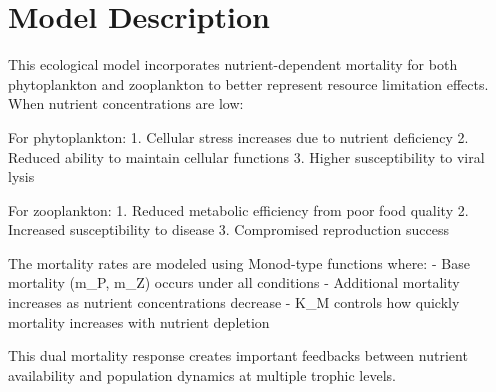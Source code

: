 \section{Model Description}

This ecological model incorporates nutrient-dependent mortality for both phytoplankton and zooplankton to better represent resource limitation effects. When nutrient concentrations are low:

For phytoplankton:
1. Cellular stress increases due to nutrient deficiency
2. Reduced ability to maintain cellular functions
3. Higher susceptibility to viral lysis

For zooplankton:
1. Reduced metabolic efficiency from poor food quality
2. Increased susceptibility to disease
3. Compromised reproduction success

The mortality rates are modeled using Monod-type functions where:
- Base mortality (m_P, m_Z) occurs under all conditions
- Additional mortality increases as nutrient concentrations decrease
- K_M controls how quickly mortality increases with nutrient depletion

This dual mortality response creates important feedbacks between nutrient availability and population dynamics at multiple trophic levels.
